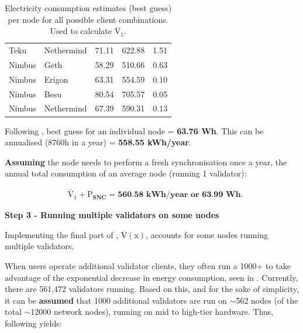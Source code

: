 \begin{table}[htb!]
\begin{tabular}{|ll|l|l|l|}
\multicolumn{1}{|l|}{Teku}               & Nethermind         & 71.11 & 622.88 & 1.51  \\ \cline{1-2}
\multicolumn{1}{|l|}{Nimbus}             & Geth               & 58.29 & 510.66 & 0.63  \\ \cline{1-2}
\multicolumn{1}{|l|}{Nimbus}             & Erigon             & 63.31 & 554.59 & 0.10  \\ \cline{1-2}
\multicolumn{1}{|l|}{Nimbus}             & Besu               & 80.54 & 705.57 & 0.05  \\ \cline{1-2}
\multicolumn{1}{|l|}{Nimbus}             & Nethermind         & 67.39 & 590.31 & 0.13  \\ \hline
\end{tabular}
\caption{Electricity consumption estimates (best guess) per node for all possible client combinations. Used to calculate $\boldsymbol{\mathrm{\overline{V}_{1}}}$.  }
\label{Table:EstimatesPerNode}
\end{table}

Following , best guess for an individual node =  \textbf{63.76 Wh}. This can be annualised (8760h in a year) = \textbf{558.55 kWh/year}.

\textbf{Assuming} the node needs to perform a fresh synchronisation once a year, the annual total consumption of an average node (running 1 validator):

\begin{align}
    &\boldsymbol{ \mathrm{\overline{V}_{1}} + \mathrm{P}_{SNC} = \text{560.58 kWh/year or 63.99 Wh.}} \nonumber
\end{align} 

\textbf{ Step 3 - Running multiple validators on some nodes}

Implementing the final part of , $\boldsymbol{\mathrm{\overline{V}(\mathrm{x})}}$, accounts for some nodes running multiple validators. 

When users operate additional validator clients, they often run a 1000+ to take advantage of the exponential decrease in energy consumption, seen in . Currently, there are 561,472 validators running. Based on this, and for the sake of simplicity, it can be \textbf{assumed} that 1000 additional validators are run on $\sim$562 nodes (of the total $\sim$12000 network nodes), running on mid to high-tier hardware. Thus, following  yields:

